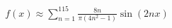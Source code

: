 \documentclass[preview]{standalone}
\begin{document}
\begin{align*}
f(x) \approx \sum_{n=1}^{115} \frac{8n}{\pi(4n^2-1)} \sin(2nx)
\end{align*}
\end{document}
